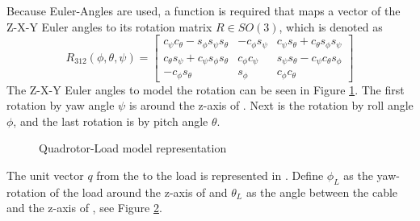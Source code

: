 Because Euler-Angles are used, a function is required that maps a vector of the Z-X-Y Euler angles to its rotation matrix $ R\in SO(3) $, which is denoted as \cite{Mahony2012}
\begin{equation}\label{key}
R_{312}({\phi},{\theta},{\psi})=\begin{bmatrix}
c_{\psi}c_{\theta}-s_{\phi}s_{\psi}s_{\theta}&-c_{\phi}s_{\psi}&c_{\psi}s_{\theta}+c_{\theta}s_{\phi}s_{\psi}\\
c_{\theta}s_{\psi}+c_{\psi}s_{\phi}s_{\theta}&c_{\phi}c_{\psi}&s_{\psi}s_{\theta}-c_{\psi}c_{\theta}s_{\phi}\\
-c_{\phi}s_{\theta}&s_{\phi}&c_{\phi}c_{\theta}
\end{bmatrix}
\end{equation}
The Z-X-Y Euler angles to model the rotation can be seen in Figure \ref{fig:mod.modelQRtrad}. The first rotation by yaw angle $ \psi $ is around the z-axis of \IF. Next is the rotation by roll angle $ \phi $, and the last rotation is by pitch angle $ \theta $.
\begin{figure}[h!]
	\centering
	\caption{Quadrotor-Load model representation\label{fig:mod.modelQRtrad}}
\end{figure}

The unit vector $ q $ from the  to the load is represented in \BF. Define $ \phi_L $ as the yaw-rotation of the load around the z-axis of \BF and $ \theta_L $ as the angle between the cable and the z-axis of \BF, see Figure \ref{fig:mod.modelQRLtrad}.
\begin{figure}[h!]
	\centering
	\caption{\label{fig:mod.modelQRLtrad}}
\end{figure}	

